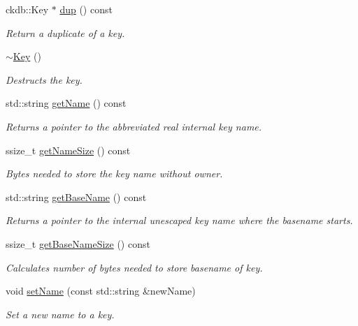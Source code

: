 \begin{DoxyCompactItemize}
ckdb\-::\-Key $\ast$ \hyperlink{classkdb_1_1Key_a43a1f28d7a0d40f0ded8473d480931ff}{dup} () const 
\begin{DoxyCompactList}\small\item\em Return a duplicate of a key.  \end{DoxyCompactList}\item 
\hyperlink{classkdb_1_1Key_a35dd6ae58d125a298e30aed13b15c1f4}{$\sim$\-Key} ()
\begin{DoxyCompactList}\small\item\em Destructs the key. \end{DoxyCompactList}\item 
std\-::string \hyperlink{classkdb_1_1Key_aa3903afe9a4b7aebf427a74612a803cd}{get\-Name} () const 
\begin{DoxyCompactList}\small\item\em Returns a pointer to the abbreviated real internal {\ttfamily key} name.  \end{DoxyCompactList}\item 
ssize\-\_\-t \hyperlink{classkdb_1_1Key_aee1d42f22eda4d84d78ab72cd60cc005}{get\-Name\-Size} () const 
\begin{DoxyCompactList}\small\item\em Bytes needed to store the key name without owner.  \end{DoxyCompactList}\item 
std\-::string \hyperlink{classkdb_1_1Key_a43d3efd13e01624c520346a19984750b}{get\-Base\-Name} () const 
\begin{DoxyCompactList}\small\item\em Returns a pointer to the internal unescaped key name where the {\ttfamily basename} starts.  \end{DoxyCompactList}\item 
ssize\-\_\-t \hyperlink{classkdb_1_1Key_a92fde543f3fbfaa0f8af80dad12a9fe7}{get\-Base\-Name\-Size} () const 
\begin{DoxyCompactList}\small\item\em Calculates number of bytes needed to store basename of {\ttfamily key}.  \end{DoxyCompactList}\item 
void \hyperlink{classkdb_1_1Key_aac3b5d3a854d02187484bfbdbdf975af}{set\-Name} (const std\-::string \&new\-Name)
\begin{DoxyCompactList}\small\item\em Set a new name to a key.  \end{DoxyCompactList}\item 

\end{DoxyCompactItemize}
